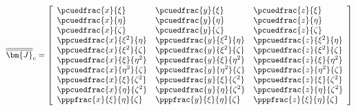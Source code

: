 \documentclass{article}
\begin{document}
\[ \begin{equation}\label{eqn:J_bar_bar_c}

\overline{\overline{\bm{J}}}_c = 

\left[ 
\begin{array}{lll}
\pcuedfrac{x}{\xi} &
\pcuedfrac{y}{\xi} &
\pcuedfrac{z}{\xi}
\\
\pcuedfrac{x}{\eta} &
\pcuedfrac{y}{\eta} &
\pcuedfrac{z}{\eta}
\\
\pcuedfrac{x}{\zeta} &
\pcuedfrac{y}{\zeta} &
\pcuedfrac{z}{\zeta}
\\
\ppcuedfrac{x}{\xi^2}{\eta} &
\ppcuedfrac{y}{\xi^2}{\eta} &
\ppcuedfrac{z}{\xi^2}{\eta}
\\
\ppcuedfrac{x}{\xi^2}{\zeta} &
\ppcuedfrac{y}{\xi^2}{\zeta} &
\ppcuedfrac{z}{\xi^2}{\zeta}
\\
\ppcuedfrac{x}{\xi}{\eta^2} &
\ppcuedfrac{y}{\xi}{\eta^2} &
\ppcuedfrac{z}{\xi}{\eta^2}
\\
\ppcuedfrac{x}{\eta^2}{\zeta} &
\ppcuedfrac{y}{\eta^2}{\zeta} &
\ppcuedfrac{z}{\eta^2}{\zeta}
\\
\ppcuedfrac{x}{\xi}{\zeta^2} &
\ppcuedfrac{y}{\xi}{\zeta^2} &
\ppcuedfrac{z}{\xi}{\zeta^2}
\\
\ppcuedfrac{x}{\eta}{\zeta^2} &
\ppcuedfrac{y}{\eta}{\zeta^2} &
\ppcuedfrac{z}{\eta}{\zeta^2}
\\
\pppfrac{x}{\xi}{\eta}{\zeta} &
\pppfrac{y}{\xi}{\eta}{\zeta} &
\pppfrac{z}{\xi}{\eta}{\zeta} 
\end{array} 
\right]
\end{equation} \]
\pagebreak
\end{document}
